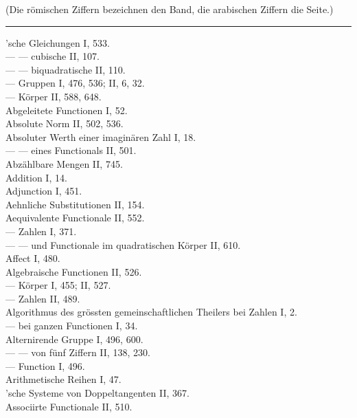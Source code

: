 \begin{center}
\end{center}

\begin{center}
(Die r\"omischen Ziffern bezeichnen den Band, die arabischen Ziffern die Seite.)
\end{center}

\begin{center}
\rule{3cm}{0.5pt}
\end{center}

\noindent
{}'sche Gleichungen I, 533.\\
--- --- cubische II, 107.\\
--- --- biquadratische II, 110.\\
--- Gruppen I, 476, 536; II, 6, 32.\\
--- K\"orper II, 588, 648.\\
Abgeleitete Functionen I, 52.\\
Absolute Norm II, 502, 536.\\
Absoluter Werth einer imagin\"aren Zahl I, 18.\\
--- --- eines Functionals II, 501.\\
Abz\"ahlbare Mengen II, 745.\\
Addition I, 14.\\
Adjunction I, 451.\\
Aehnliche Substitutionen II, 154.\\
Aequivalente Functionale II, 552.\\
--- Zahlen I, 371.\\
--- --- und Functionale im quadratischen K\"orper II, 610.\\
Affect I, 480.\\
Algebraische Functionen II, 526.\\
--- K\"orper I, 455; II, 527.\\
--- Zahlen II, 489.\\
Algorithmus des gr\"ossten gemeinschaftlichen Theilers bei Zahlen I, 2.\\
--- bei ganzen Functionen I, 34.\\
Alternirende Gruppe I, 496, 600.\\
--- --- von f\"unf Ziffern II, 138, 230.\\
--- Function I, 496.\\
Arithmetische Reihen I, 47.\\
'sche Systeme von Doppeltangenten II, 367.\\
Associirte Functionale II, 510.\\


